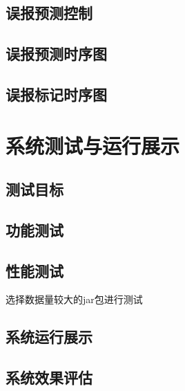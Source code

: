 \subsection{误报预测控制}

\subsection{误报预测时序图}

\subsection{误报标记时序图}

\section{系统测试与运行展示}
\subsection{测试目标}
\subsection{功能测试}
\subsection{性能测试}
选择数据量较大的jar包进行测试
\subsection{系统运行展示}
\subsection{系统效果评估}